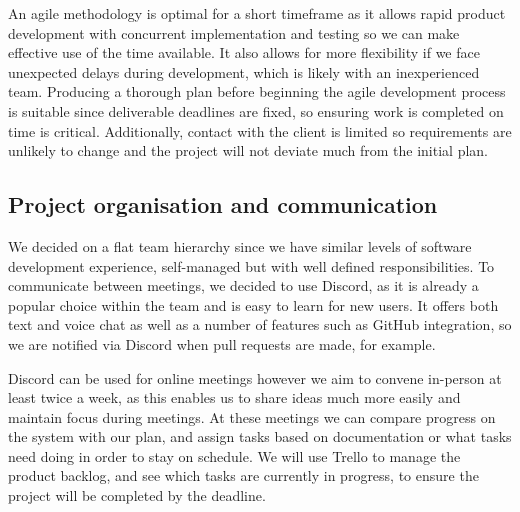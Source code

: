 \documentclass[10pt]{article}
\begin{document}
An agile methodology is optimal for a short timeframe as it allows rapid product
development with concurrent implementation and testing so we can make effective
use of the time available. It also allows for more flexibility if we face
unexpected delays during development, which is likely with an inexperienced
team. Producing a thorough plan before beginning the agile development process
is suitable since deliverable deadlines are fixed, so ensuring work is completed
on time is critical. Additionally, contact with the client is limited so
requirements are unlikely to change and the project will not deviate much from
the initial plan.


\subsection{Project organisation and communication}
We decided on a flat team hierarchy since we have similar levels of software
development experience, self-managed but with well defined responsibilities. To
communicate between meetings, we decided to use Discord, as it is already a
popular choice within the team and is easy to learn for new users. It offers
both text and voice chat as well as a number of features such as GitHub
integration, so we are notified via Discord when pull requests are made, for
example.

Discord can be used for online meetings however we aim to convene in-person at
least twice a week, as this enables us to share ideas much more easily and
maintain focus during meetings. At these meetings we can compare progress on the
system with our plan, and assign tasks based on documentation or what tasks need
doing in order to stay on schedule. We will use Trello to manage the product
backlog, and see which tasks are currently in progress, to ensure the project
will be completed by the deadline.
\end{document}
